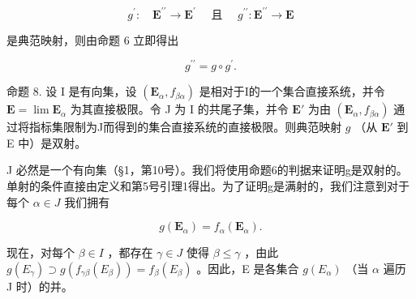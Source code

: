 \[
g ^ {\prime}: \quad \mathbf {E} ^ {\prime \prime} \rightarrow \mathbf {E} ^ {\prime} \quad \text { 且 } \quad g ^ {\prime \prime}: \mathbf {E} ^ {\prime \prime} \rightarrow \mathbf {E}
\]

是典范映射，则由命题 6 立即得出

\[
g ^ {\prime \prime} = g \circ g ^ {\prime}.\tag{28}
\]

命题 8. 设 I 是有向集，设 \((\mathbf{E}_{\alpha}, f_{\beta \alpha})\) 是相对于I的一个集合直接系统，并令 \(\mathbf{E} = \lim \mathbf{E}_{\alpha}\) 为其直接极限。令 J 为 I 的共尾子集，并令 \(\mathbf{E}'\) 为由 \((\mathbf{E}_{\alpha}, f_{\beta \alpha})\) 通过将指标集限制为J而得到的集合直接系统的直接极限。则典范映射 \(g\) （从 \(\mathbf{E}'\) 到 E 中）是双射。

J 必然是一个有向集（§1，第10号）。我们将使用命题6的判据来证明g是双射的。单射的条件直接由定义和第5号引理1得出。为了证明g是满射的，我们注意到对于每个 \(\alpha \in J\) 我们拥有

\[
g (\mathbf {E} _ {\alpha}) = f _ {\alpha} (\mathbf {E} _ {\alpha}).
\]

现在，对每个 \(\beta \in I\) ，都存在 \(\gamma \in J\) 使得 \(\beta \leqslant \gamma\) ，由此 \(g(E_{\gamma}) \supset g(f_{\gamma \beta}(E_{\beta})) = f_{\beta}(E_{\beta})\) 。因此，E 是各集合 \(g(E_{\alpha})\) （当 \(\alpha\) 遍历 J 时）的并。

